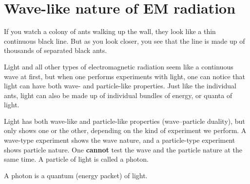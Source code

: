     \label{m38777*cid3}
            \section{Wave-like nature of EM radiation}
            \nopagebreak
      \label{m38777*id186686}If you watch a colony of ants walking up the wall, they look like a thin continuous black line. But as you look closer, you see that the line is made up of thousands of separated black ants.\par 
      \label{m38777*id187029}Light and all other types of electromagnetic radiation seem like a continuous wave at first, but when one performs experiments with light, one can notice that light can have both wave- and particle-like properties. Just like the individual ants, light can also be made up of individual bundles of energy, or quanta of light.\par 
      \label{m38777*id187035}Light has both wave-like and particle-like properties (wave--particle duality), but only shows one or the other, depending on the kind of experiment we perform. A wave-type experiment shows the wave nature, and a particle-type experiment shows particle nature. One \textbf{cannot} test the wave and the particle nature at the same time. A particle of light is called a photon.\par 




\label{m38777*fhsst!!!underscore!!!id75} {A photon is a quantum (energy packet) of light.} 


\label{m38777*secfhsst!!!underscore!!!id79}

